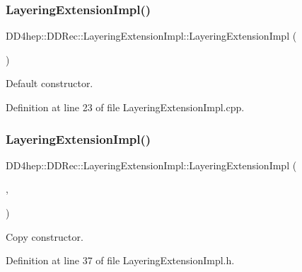 \subsubsection{\texorpdfstring{Layering\+Extension\+Impl()}{LayeringExtensionImpl()}\hspace{0.1cm}{\footnotesize\ttfamily [1/2]}}
{\footnotesize\ttfamily D\+D4hep\+::\+D\+D\+Rec\+::\+Layering\+Extension\+Impl\+::\+Layering\+Extension\+Impl (\begin{DoxyParamCaption}{ }\end{DoxyParamCaption})}



Default constructor. 



Definition at line 23 of file Layering\+Extension\+Impl.\+cpp.

\hypertarget{class_d_d4hep_1_1_d_d_rec_1_1_layering_extension_impl_aa8410cb9758c1ab2aeaa4a02478c3ed0}{}\label{class_d_d4hep_1_1_d_d_rec_1_1_layering_extension_impl_aa8410cb9758c1ab2aeaa4a02478c3ed0} 
\subsubsection{\texorpdfstring{Layering\+Extension\+Impl()}{LayeringExtensionImpl()}\hspace{0.1cm}{\footnotesize\ttfamily [2/2]}}
{\footnotesize\ttfamily D\+D4hep\+::\+D\+D\+Rec\+::\+Layering\+Extension\+Impl\+::\+Layering\+Extension\+Impl (\begin{DoxyParamCaption}\item[{const \hyperlink{class_d_d4hep_1_1_d_d_rec_1_1_layering_extension_impl}{Layering\+Extension\+Impl} \&}]{,  }\item[{const \hyperlink{class_d_d4hep_1_1_geometry_1_1_det_element}{Geometry\+::\+Det\+Element} \&}]{ }\end{DoxyParamCaption})\hspace{0.3cm}{\ttfamily [inline]}}



Copy constructor. 



Definition at line 37 of file Layering\+Extension\+Impl.\+h.



